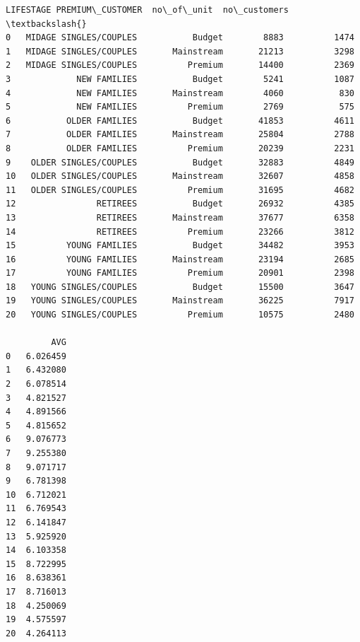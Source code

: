 \documentclass[11pt]{article}
\makeatletter
\newcommand{\boxspacing}{\kern\kvtcb@left@rule\kern\kvtcb@boxsep}
\newcommand{\prompt}[4]{
        {\ttfamily\llap{{\color{#2}[#3]:\hspace{3pt}#4}}\vspace{-\baselineskip}}
    }
\makeatother
\begin{document}
            \begin{tcolorbox}[breakable, size=fbox, boxrule=.5pt, pad at break*=1mm, opacityfill=0]
\prompt{Out}{outcolor}{284}{\boxspacing}
\begin{Verbatim}[commandchars=\\\{\}]
                 LIFESTAGE PREMIUM\_CUSTOMER  no\_of\_unit  no\_customers  \textbackslash{}
0   MIDAGE SINGLES/COUPLES           Budget        8883          1474
1   MIDAGE SINGLES/COUPLES       Mainstream       21213          3298
2   MIDAGE SINGLES/COUPLES          Premium       14400          2369
3             NEW FAMILIES           Budget        5241          1087
4             NEW FAMILIES       Mainstream        4060           830
5             NEW FAMILIES          Premium        2769           575
6           OLDER FAMILIES           Budget       41853          4611
7           OLDER FAMILIES       Mainstream       25804          2788
8           OLDER FAMILIES          Premium       20239          2231
9    OLDER SINGLES/COUPLES           Budget       32883          4849
10   OLDER SINGLES/COUPLES       Mainstream       32607          4858
11   OLDER SINGLES/COUPLES          Premium       31695          4682
12                RETIREES           Budget       26932          4385
13                RETIREES       Mainstream       37677          6358
14                RETIREES          Premium       23266          3812
15          YOUNG FAMILIES           Budget       34482          3953
16          YOUNG FAMILIES       Mainstream       23194          2685
17          YOUNG FAMILIES          Premium       20901          2398
18   YOUNG SINGLES/COUPLES           Budget       15500          3647
19   YOUNG SINGLES/COUPLES       Mainstream       36225          7917
20   YOUNG SINGLES/COUPLES          Premium       10575          2480

         AVG
0   6.026459
1   6.432080
2   6.078514
3   4.821527
4   4.891566
5   4.815652
6   9.076773
7   9.255380
8   9.071717
9   6.781398
10  6.712021
11  6.769543
12  6.141847
13  5.925920
14  6.103358
15  8.722995
16  8.638361
17  8.716013
18  4.250069
19  4.575597
20  4.264113
\end{Verbatim}
\end{tcolorbox}
        
\end{document}
